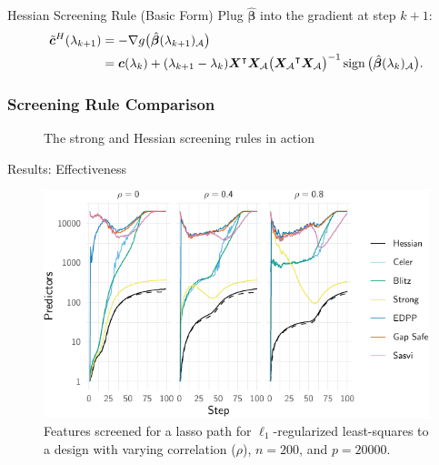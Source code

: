 \documentclass[10pt]{beamer}
\begin{document}
\begin{frame}
  \pause

  \begin{exampleblock}{Hessian Screening Rule (Basic Form)}
    Plug \(\hat{\bm{\beta}}\) into the gradient at step \(k + 1\):
    \begin{equation*}
      \begin{aligned}
        \tilde{\bm{c}}^H(\lambda_{k+1})
         & = -\nabla g\big(\hat{\bm{\beta}}(\lambda_{k+1})_\mathcal{A}\big)                      \\
         & = \bm{c}(\lambda_k) + (\lambda_{k+1} - \lambda_k)\bm{X}^\intercal {\bm{X}_\mathcal{A}}
        \big({\bm{X}_\mathcal{A}}^\intercal \bm{X}_\mathcal{A}\big)^{-1}
        \operatorname{sign}\big(\hat{\bm{\beta}}(\lambda_k)_\mathcal{A}\big).
      \end{aligned}
    \end{equation*}
  \end{exampleblock}

\end{frame}

\begin{frame}[c]
  \frametitle{Screening Rule Comparison}

  \begin{figure}[tpb]
    \centering
    \pgfplotsset{width=9cm,height=7cm}
    
    \caption{%
      The strong and Hessian screening rules in action
    }
  \end{figure}
\end{frame}

\begin{frame}{Results: Effectiveness}
  \begin{figure}
    \centering
    \includegraphics[width=\textwidth]{figures/paper3-simulateddata-efficiency}
    \caption{%
      Features screened for a lasso path for \(\ell_1\)-regularized
      least-squares to a design with varying correlation (\(\rho\)), \(n = 200\), and \(p =
      \num{20000}\).
    }
  \end{figure}
\end{frame}
\end{document}
